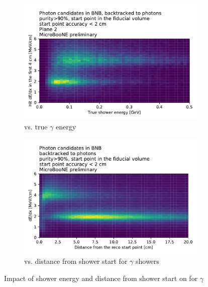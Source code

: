 \begin{figure}[H] 
\begin{center}
    \begin{subfigure}[b]{0.45\textwidth}
    \centering
    \includegraphics[width=1.00\textwidth]{egamma/plane2_photon_2d_dedx_sh_energy.pdf}
    \caption{\label{fig:dedxgammas:energy} \dedx vs. true $\gamma$ energy}
    \end{subfigure}
    \begin{subfigure}[b]{0.45\textwidth}
    \centering
    \includegraphics[width=1.00\textwidth]{egamma/photon_2d_dedx_dist.pdf}
    \caption{\label{fig:dedxgammas:dist} \dedx vs. distance from shower start for $\gamma$ showers}
    \end{subfigure}
\caption{\label{fig:dedxgammas} Impact of shower energy and distance from shower start on \dedx for  $\gamma$}
\end{center}
\end{figure}

